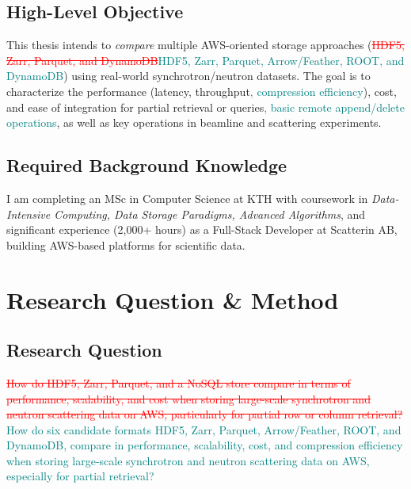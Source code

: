 \documentclass{article}
\begin{document}
\subsection{High-Level Objective}
This thesis intends to \emph{compare} multiple AWS-oriented storage approaches (\textcolor{red}{\sout{HDF5, Zarr, Parquet, and DynamoDB}}\textcolor{teal}{HDF5, Zarr, Parquet, Arrow/Feather, ROOT, and DynamoDB}) using real-world synchrotron/neutron datasets. The goal is to characterize the performance (latency, throughput\textcolor{teal}{, compression efficiency}), cost, and ease of integration for partial retrieval or queries\textcolor{teal}{, basic remote append/delete operations}, as well as key operations in beamline and scattering experiments.


\subsection{Required Background Knowledge}
I am completing an MSc in Computer Science at KTH with coursework in \emph{Data-Intensive Computing, Data Storage Paradigms, Advanced Algorithms}, and significant experience (2,000+ hours) as a Full-Stack Developer at Scatterin AB, building AWS-based platforms for scientific data.






\section{Research Question \& Method}

\subsection{Research Question}
\textcolor{red}{\sout{How do HDF5, Zarr, Parquet, and a NoSQL store compare in terms of performance, scalability, and cost when storing large-scale synchrotron and neutron scattering data on AWS, particularly for partial row or column retrieval?}}
\textcolor{teal}{How do six candidate formats HDF5, Zarr, Parquet, Arrow/Feather, ROOT, and DynamoDB, compare in performance, scalability, cost, and compression efficiency when storing large-scale synchrotron and neutron scattering data on AWS, especially for partial retrieval?}
\end{document}
